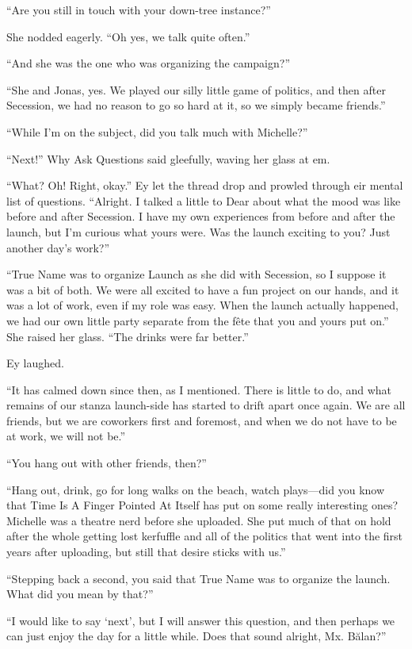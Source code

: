 ``Are you still in touch with your down-tree instance?''

She nodded eagerly. ``Oh yes, we talk quite often.''

``And she was the one who was organizing the campaign?''

``She and Jonas, yes. We played our silly little game of politics, and then after Secession, we had no reason to go so hard at it, so we simply became friends.''

``While I'm on the subject, did you talk much with Michelle?''

``Next!'' Why Ask Questions said gleefully, waving her glass at em.

``What? Oh! Right, okay.'' Ey let the thread drop and prowled through eir mental list of questions. ``Alright. I talked a little to Dear about what the mood was like before and after Secession. I have my own experiences from before and after the launch, but I'm curious what yours were. Was the launch exciting to you? Just another day's work?''

``True Name was to organize Launch as she did with Secession, so I suppose it was a bit of both. We were all excited to have a fun project on our hands, and it was a lot of work, even if my role was easy. When the launch actually happened, we had our own little party separate from the fête that you and yours put on.'' She raised her glass. ``The drinks were far better.''

Ey laughed.

``It has calmed down since then, as I mentioned. There is little to do, and what remains of our stanza launch-side has started to drift apart once again. We are all friends, but we are coworkers first and foremost, and when we do not have to be at work, we will not be.''

``You hang out with other friends, then?''

``Hang out, drink, go for long walks on the beach, watch plays---did you know that Time Is A Finger Pointed At Itself has put on some really interesting ones? Michelle was a theatre nerd before she uploaded. She put much of that on hold after the whole getting lost kerfuffle and all of the politics that went into the first years after uploading, but still that desire sticks with us.''

``Stepping back a second, you said that True Name was to organize the launch. What did you mean by that?''

``I would like to say `next', but I will answer this question, and then perhaps we can just enjoy the day for a little while. Does that sound alright, Mx. Bălan?''


